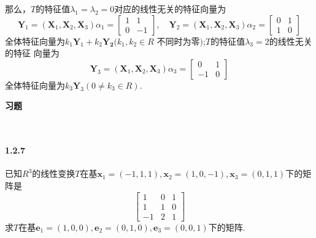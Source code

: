 \documentclass[12pt, a4paper, oneside, fontset=none]{ctexart}
\begin{document}
那么，$T$的特征值$\lambda_1 = \lambda_2 = 0$对应的线性无关的特征向量为
\[
    \bm{Y}_1 = (\bm{X}_1, \bm{X}_2, \bm{X}_3) \alpha_1 = \begin{bmatrix}
        1 & 1  \\
        0 & -1
    \end{bmatrix}, \quad \bm{Y}_2  = (\bm{X}_1, \bm{X}_2, \bm{X}_3) \alpha_2 = \begin{bmatrix}
        0 & 1 \\
        1 & 0
    \end{bmatrix}
\]
全体特征向量为$k_1\bm{Y}_1 + k_2\bm{Y_2}(k_1, k_2 \in R$ 不同时为零$)$;$T$的特征值$\lambda_3 = 2$的线性无关的特征
向量为
\[
    \bm{Y}_3 = (\bm{X}_1, \bm{X}_2, \bm{X}_3) \alpha_3 = \begin{bmatrix}
        0  & 1 \\
        -1 & 0
    \end{bmatrix}
\]
全体特征向量为$k_3\bm{Y}_3(0\neq k_3 \in R).$

\centerline{\large{\textbf{习题}}} \ \par

\paragraph*{1.2.7} 已知$R^3$的线性变换$T$在基$\bm{x}_1 = (-1,1,1),\bm{x}_2 = (1,0,-1), \bm{x}_3 = (0,1,1)$下的矩阵是
\[
    \begin{bmatrix}
        1  & 0 & 1 \\
        1  & 1 & 0 \\
        -1 & 2 & 1
    \end{bmatrix}
\]
求$T$在基$\bm{e}_1 = (1,0,0),\bm{e}_2 = (0,1,0),\bm{e}_3 = (0,0,1)$下的矩阵.
\end{document}
